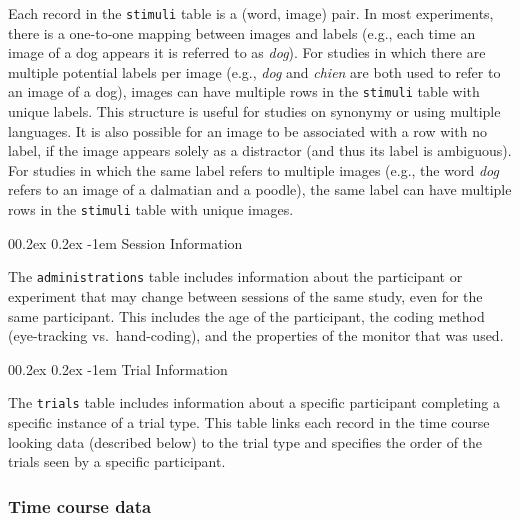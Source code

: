 \documentclass[
  english,
  man,floatsintext]{apa6}
\makeatletter
\let\oldparagraph\paragraph
\renewcommand{\paragraph}[1]{\oldparagraph{#1}\mbox{}}
\renewcommand{\paragraph}{\@startsection{paragraph}{4}{\parindent}%
  {0\baselineskip \@plus 0.2ex \@minus 0.2ex}%
  {-1em}%
  {\normalfont\normalsize\bfseries\itshape\typesectitle}}
\makeatother
\begin{document}
Each record in the \texttt{stimuli} table is a (word, image) pair.
In most experiments, there is a one-to-one mapping between images and labels (e.g., each time an image of a dog appears it is referred to as \emph{dog}).
For studies in which there are multiple potential labels per image (e.g., \emph{dog} and \emph{chien} are both used to refer to an image of a dog), images can have multiple rows in the \texttt{stimuli} table with unique labels.
This structure is useful for studies on synonymy or using multiple languages.
It is also possible for an image to be associated with a row with no label, if the image appears solely as a distractor (and thus its label is ambiguous).
For studies in which the same label refers to multiple images (e.g., the word \emph{dog} refers to an image of a dalmatian and a poodle), the same label can have multiple rows in the \texttt{stimuli} table with unique images.

\hypertarget{session-information}{%
\paragraph{Session Information}\label{session-information}}

The \texttt{administrations} table includes information about the participant or experiment that may change between sessions of the same study, even for the same participant.
This includes the age of the participant, the coding method (eye-tracking vs.~hand-coding), and the properties of the monitor that was used.

\hypertarget{trial-information}{%
\paragraph{Trial Information}\label{trial-information}}

The \texttt{trials} table includes information about a specific participant completing a specific instance of a trial type.
This table links each record in the time course looking data (described below) to the trial type and specifies the order of the trials seen by a specific participant.

\hypertarget{time-course-data}{%
\subsubsection{Time course data}\label{time-course-data}}
\end{document}
